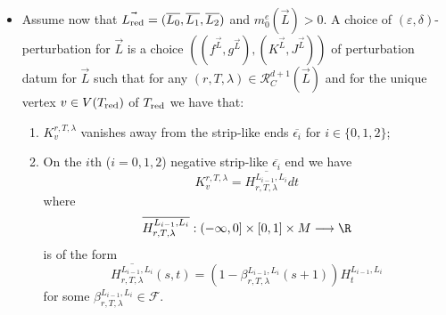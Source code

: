 \begin{itemize}
\begin{enumerate}
		\end{enumerate}
		\item[\textbf{Case 5}] Assume now that $\vec{L_\textnormal{red}}=(\overline{L_0},\overline{L_1}, \overline{L_2})$ and $m_0^e(\vec{L})>0$. A choice of $(\varepsilon,\delta)$-perturbation for $\vec{L}$ is a choice $\left((f^{\vec{L}},g^{\vec{L}}),(K^{\vec{L}},J^{\vec{L}})\right)$ of perturbation datum for $\vec{L}$ such that for any $(r,T,\lambda)\in \mathcal{R}^{d+1}_C(\vec{L})$ and for the unique vertex $v\in V(T_\textnormal{red})$ of $T_\textnormal{red}$ we have that: \begin{enumerate}
			\item $K^{r,T,\lambda}_v$ vanishes away from the strip-like ends $\overline{\epsilon_i}$ for $i\in \{0,1,2\}$;
			\item On the $i$th ($i=0,1,2$) negative strip-like $\overline{\epsilon_i}$ end we have $$K^{r,T,\lambda}_v=\overline{H^{L_{i-1},L_i}_{r,T,\lambda}}dt$$ where $$\overline{H^{L_{i-1},L_i}_{r,T,\lambda}}: (-\infty,0]\times [0,1]\times M \longrightarrow \R$$ is of the form $$\overline{H^{L_{i-1},L_i}_{r,T,\lambda}}(s,t)= (1-\beta^{L_{i-1},L_i}_{r,T,\lambda}(s+1))H^{L_{i-1},L_i}_t$$ for some $\beta^{L_{i-1},L_i}_{r,T,\lambda}\in \mathcal{F}$. \end{enumerate}
		
	\end{itemize}
	
